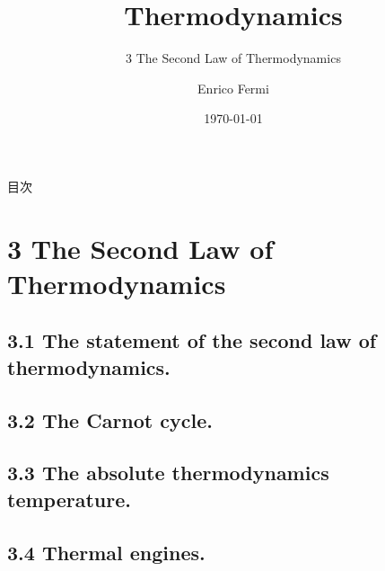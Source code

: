 \documentclass[dvipdfmx, 10pt, aspectratio = 169]{beamer}
\title{Thermodynamics}
\subtitle{3 The Second Law of Thermodynamics}
\date{\today}
\author{Enrico Fermi}
\begin{document}
\begin{frame}
	\titlepage
\end{frame}

\begin{frame}{目次}
\tableofcontents
\end{frame}

\section{3 The Second Law of Thermodynamics}
\subsection{3.1 The statement of the second law of thermodynamics.}
\subsection{3.2 The Carnot cycle.}
\subsection{3.3 The absolute thermodynamics temperature.}
\subsection{3.4 Thermal engines.}
\end{document}
